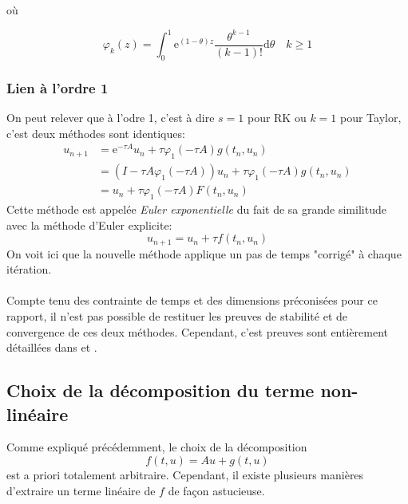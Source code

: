 où

\begin{equation} 
    \varphi_{k}(z)=\int_{0}^{1} \mathrm{e}^{(1-\theta) z} \frac{\theta^{k-1}}{(k-1) !} \mathrm{d} \theta \quad k \geq 1
\end{equation}

\subsubsection{Lien à l'ordre 1}
On peut relever que à l'odre 1, c'est à dire $s=1$ pour RK ou $k=1$ pour Taylor, c'est deux méthodes sont identiques:
\begin{equation} 
    \begin{aligned} u_{n+1} &=\mathrm{e}^{-\tau A} u_{n}+\tau \varphi_{1}(-\tau A) g\left(t_{n}, u_{n}\right) \\ &=\left(I-\tau A \varphi_{1}(-\tau A)\right) u_{n}+\tau \varphi_{1}(-\tau A) g\left(t_{n}, u_{n}\right) \\ &=u_{n}+\tau \varphi_{1}(-\tau A) F\left(t_{n}, u_{n}\right) \end{aligned}
\end{equation}
Cette méthode est appelée \emph{Euler exponentielle} du fait de sa grande similitude avec la méthode d'Euler explicite:
$$
u_{n+1} = u_n + \tau f(t_n,u_n)
$$
On voit ici que la nouvelle méthode applique un pas de temps "corrigé" à chaque itération.
\paragraph{}
Compte tenu des contrainte de temps et des dimensions préconisées pour ce rapport, il n'est pas possible de restituer les preuves de stabilité et de convergence de ces deux méthodes. Cependant, c'est preuves sont entièrement détaillées dans \cite{ExpIntegrators} et \cite{Taylor}.

\subsection{Choix de la décomposition du terme non-linéaire}
Comme expliqué précédemment, le choix de la décomposition 
$$
f(t,u) = Au+g(t,u)
$$
est a priori totalement arbitraire. Cependant, il existe plusieurs manières d'extraire un terme linéaire de $f$ de façon astucieuse.

